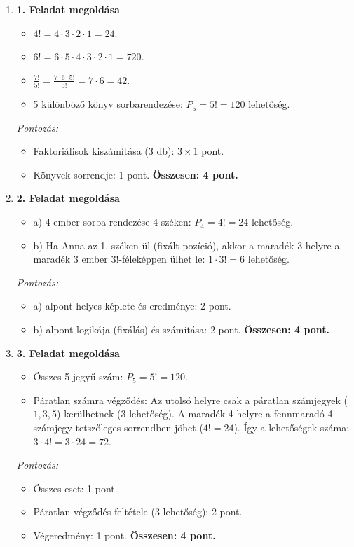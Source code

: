 \documentclass[12pt,a4paper]{article}
\begin{document}
\begin{enumerate}
    \item \textbf{1. Feladat megoldása}
    \begin{itemize}
        \item $4! = 4 \cdot 3 \cdot 2 \cdot 1 = 24$.
        \item $6! = 6 \cdot 5 \cdot 4 \cdot 3 \cdot 2 \cdot 1 = 720$.
        \item $\frac{7!}{5!} = \frac{7 \cdot 6 \cdot 5!}{5!} = 7 \cdot 6 = 42$.
        \item 5 különböző könyv sorbarendezése: $P_5 = 5! = 120$ lehetőség.
    \end{itemize}
    \emph{Pontozás:}
    \begin{itemize}
        \item Faktoriálisok kiszámítása (3 db): $3 \times 1$ pont.
        \item Könyvek sorrendje: 1 pont.
        \textbf{Összesen: 4 pont.}
    \end{itemize}

    \vspace{0.3cm}

    \item \textbf{2. Feladat megoldása}
    \begin{itemize}
        \item a) 4 ember sorba rendezése 4 széken: $P_4 = 4! = 24$ lehetőség.
        \item b) Ha Anna az 1. széken ül (fixált pozíció), akkor a maradék 3 helyre a maradék 3 ember $3!$-féleképpen ülhet le: $1 \cdot 3! = 6$ lehetőség.
    \end{itemize}
    \emph{Pontozás:}
    \begin{itemize}
        \item a) alpont helyes képlete és eredménye: 2 pont.
        \item b) alpont logikája (fixálás) és számítása: 2 pont.
        \textbf{Összesen: 4 pont.}
    \end{itemize}

    \vspace{0.3cm}

    \item \textbf{3. Feladat megoldása}
    \begin{itemize}
        \item Összes 5-jegyű szám: $P_5 = 5! = 120$.
        \item Páratlan számra végződés: Az utolsó helyre csak a páratlan számjegyek ($1, 3, 5$) kerülhetnek (3 lehetőség). A maradék 4 helyre a fennmaradó 4 számjegy tetszőleges sorrendben jöhet ($4! = 24$). Így a lehetőségek száma: $3 \cdot 4! = 3 \cdot 24 = 72$.
    \end{itemize}
    \emph{Pontozás:}
    \begin{itemize}
        \item Összes eset: 1 pont.
        \item Páratlan végződés feltétele (3 lehetőség): 2 pont.
        \item Végeredmény: 1 pont.
        \textbf{Összesen: 4 pont.}
    \end{itemize}


\end{enumerate}
\end{document}

